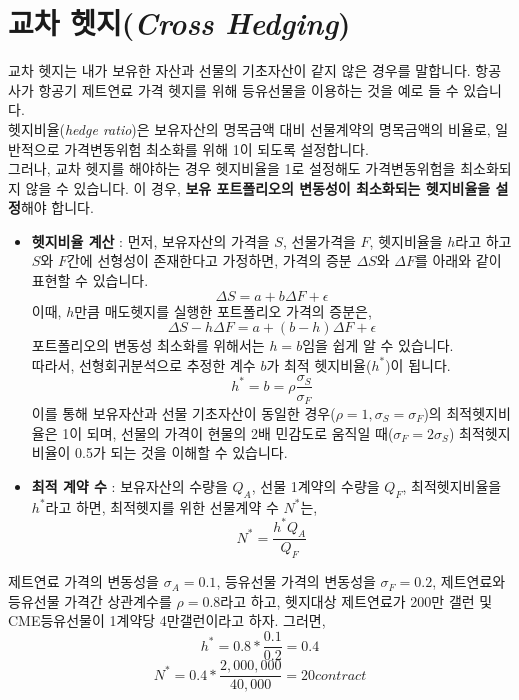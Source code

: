 \documentclass[
  letterpaper,
  DIV=11,
  numbers=noendperiod]{scrreprt}
\begin{document}
\section{\texorpdfstring{교차 헷지(\emph{Cross
Hedging})}{교차 헷지(Cross Hedging)}}\label{uxad50uxcc28-uxd5f7uxc9c0cross-hedging}

교차 헷지는 내가 보유한 자산과 선물의 기초자산이 같지 않은 경우를
말합니다. 항공사가 항공기 제트연료 가격 헷지를 위해 등유선물을 이용하는
것을 예로 들 수 있습니다.\\
헷지비율(\emph{hedge ratio})은 보유자산의 명목금액 대비 선물계약의
명목금액의 비율로, 일반적으로 가격변동위험 최소화를 위해 1이 되도록
설정합니다.\\
그러나, 교차 헷지를 해야하는 경우 헷지비율을 1로 설정해도 가격변동위험을
최소화되지 않을 수 있습니다. 이 경우, \textbf{보유 포트폴리오의 변동성이
최소화되는 헷지비율을 설정}해야 합니다.

\begin{itemize}
\item
  \textbf{헷지비율 계산} : 먼저, 보유자산의 가격을 \(S\), 선물가격을
  \(F\), 헷지비율을 \(h\)라고 하고 \(S\)와 \(F\)간에 선형성이 존재한다고
  가정하면, 가격의 증분 \(\Delta S\)와 \(\Delta F\)를 아래와 같이 표현할
  수 있습니다. \[\Delta S=a+b\Delta F+\epsilon\] 이때, \(h\)만큼
  매도헷지를 실행한 포트폴리오 가격의 증분은,
  \[\Delta S-h\Delta F=a+(b-h)\Delta F+\epsilon\] 포트폴리오의 변동성
  최소화를 위해서는 \(h=b\)임을 쉽게 알 수 있습니다.\\
  따라서, 선형회귀분석으로 추정한 계수 \(b\)가 최적 헷지비율(\(h^*\))이
  됩니다. \[h^*=b=\rho \frac{\sigma _S}{\sigma _F}\] 이를 통해
  보유자산과 선물 기초자산이 동일한
  경우(\(\rho=1, \sigma _S=\sigma _F\))의 최적헷지비율은 1이 되며,
  선물의 가격이 현물의 2배 민감도로 움직일 때(\(\sigma _F=2\sigma _S\))
  최적헷지비율이 0.5가 되는 것을 이해할 수 있습니다.
\item
  \textbf{최적 계약 수} : 보유자산의 수량을 \(Q_A\), 선물 1계약의 수량을
  \(Q_F\), 최적헷지비율을 \(h^*\)라고 하면, 최적헷지를 위한 선물계약 수
  \(N^*\)는, \[N^*=\frac{h^* Q_A}{Q_F}\]
\end{itemize}

\begin{tcolorbox}[enhanced jigsaw, opacitybacktitle=0.6, leftrule=.75mm, colback=white, toptitle=1mm, breakable, colframe=quarto-callout-note-color-frame, bottomtitle=1mm, coltitle=black, titlerule=0mm, arc=.35mm, toprule=.15mm, rightrule=.15mm, bottomrule=.15mm, title=\textcolor{quarto-callout-note-color}{\faInfo}\hspace{0.5em}{최적헷지비율 및 계약수 예시}, colbacktitle=quarto-callout-note-color!10!white, left=2mm, opacityback=0]

제트연료 가격의 변동성을 \(\sigma _A=0.1\), 등유선물 가격의 변동성을
\(\sigma _F=0.2\), 제트연료와 등유선물 가격간 상관계수를
\(\rho = 0.8\)라고 하고, 헷지대상 제트연료가 200만 갤런 및 CME등유선물이
1계약당 4만갤런이라고 하자. 그러면, \[h^*=0.8*\frac{0.1}{0.2}=0.4\]
\[N^*=0.4*\frac{2,000,000}{40,000}=20contract\]

\end{tcolorbox}
\end{document}
